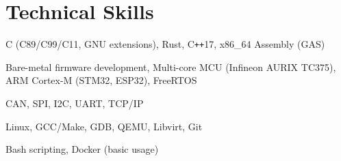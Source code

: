 \section{Technical Skills}

{
  C (C89/C99/C11, GNU extensions),
  Rust,
  C\texttt{++}17,
  x86\_64 Assembly (GAS)
}

{
  Bare-metal firmware development,
  Multi-core MCU (Infineon AURIX TC375),
  ARM Cortex-M (STM32, ESP32),
  FreeRTOS
}

{
  CAN,
  SPI,
  I2C,
  UART,
  TCP/IP
}

{
  Linux,
  GCC/Make,
  GDB,
  QEMU,
  Libvirt,
  Git
}

{
  Bash scripting,
  Docker (basic usage)
}
